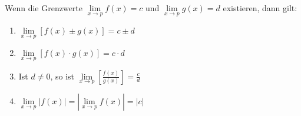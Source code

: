 Wenn die Grenzwerte $\lim\limits_{x \to p} f(x) = c$ und $\lim\limits_{x \to p} g(x) = d$ existieren, dann gilt:
\begin{enumerate}
    \item $\lim\limits_{x \to p} [f(x) \pm g(x)] = c \pm d$
    \item $\lim\limits_{x \to p} [f(x) \cdot g(x)] = c \cdot d$
    \item Ist $d \neq 0$, so ist $\lim\limits_{x \to p} \left[\frac{f(x)}{g(x)}\right] = \frac{c}{d}$
    \item $\lim\limits_{x \to p} |f(x)| = |\lim\limits_{x \to p} f(x)| = |c|$
\end{enumerate}